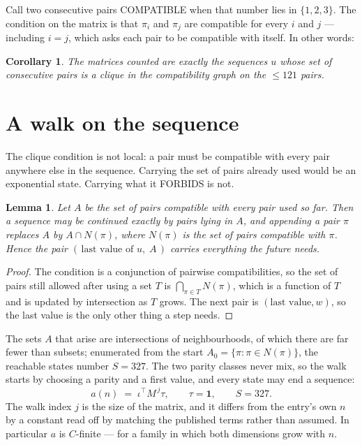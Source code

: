 \documentclass[11pt,a4paper]{article}
\theoremstyle{plain}
\newtheorem{lemma}[theorem]{Lemma}
\newtheorem{corollary}[theorem]{Corollary}
\theoremstyle{definition}
\begin{document}
Call two consecutive pairs COMPATIBLE when that number lies in $\{1,2,3\}$. The condition on the
matrix is that $\pi_i$ and $\pi_j$ are compatible for every $i$ and $j$ --- including $i=j$,
which asks each pair to be compatible with itself. In other words:

\begin{corollary}
The matrices counted are exactly the sequences $u$ whose set of consecutive pairs is a clique in
the compatibility graph on the $\le 121$ pairs.
\end{corollary}

\section{A walk on the sequence}

The clique condition is not local: a pair must be compatible with every pair anywhere else in
the sequence. Carrying the set of pairs already used would be an exponential state. Carrying
what it FORBIDS is not.

\begin{lemma}\label{lem:lump}
Let $A$ be the set of pairs compatible with every pair used so far. Then a sequence may be
continued exactly by pairs lying in $A$, and appending a pair $\pi$ replaces $A$ by
$A\cap N(\pi)$, where $N(\pi)$ is the set of pairs compatible with $\pi$. Hence the pair
$(\,\text{last value of }u,\;A\,)$ carries everything the future needs.
\end{lemma}

\begin{proof}
The condition is a conjunction of pairwise compatibilities, so the set of pairs still allowed
after using a set $T$ is $\bigcap_{\pi\in T}N(\pi)$, which is a function of $T$ and is updated
by intersection as $T$ grows. The next pair is $(\text{last value},w)$, so the last value is
the only other thing a step needs.
\end{proof}

The sets $A$ that arise are intersections of neighbourhoods, of which there are far fewer than
subsets; enumerated from the start $A_0=\{\pi:\pi\in N(\pi)\}$, the reachable states number
$S=327$. The two parity classes never mix, so the walk starts by choosing a parity and a first
value, and every state may end a sequence:
\[
a(n)\;=\;\iota^{\!\top}M^{\,j}\tau ,\qquad \tau=\mathbf{1},\qquad S=327.
\]
The walk index $j$ is the size of the matrix, and it differs from the entry's own $n$ by a
constant read off by matching the published terms rather than assumed. In particular $a$ is
$C$-finite --- for a family in which both dimensions grow with $n$.
\end{document}
